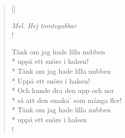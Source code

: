 
\settowidth{\versewidth}{Tänk om jag hade lilla nubben}



\begin{verse}[\versewidth]

\flagverse{}
\emph{Mel. Hej tomtegubbar}\\!


Tänk om jag hade lilla nubben\\*
uppå ett snöre i halsen!\\*
Tänk om jag hade lilla nubben\\*
Uppå ett snöre i halsen!\\*
Och kunde dra den upp och ner\\*
så att den smaka' som många fler!\\*
Tänk om jag hade lilla nubben\\*
uppå ett snöre i halsen\\!


\end{verse}

